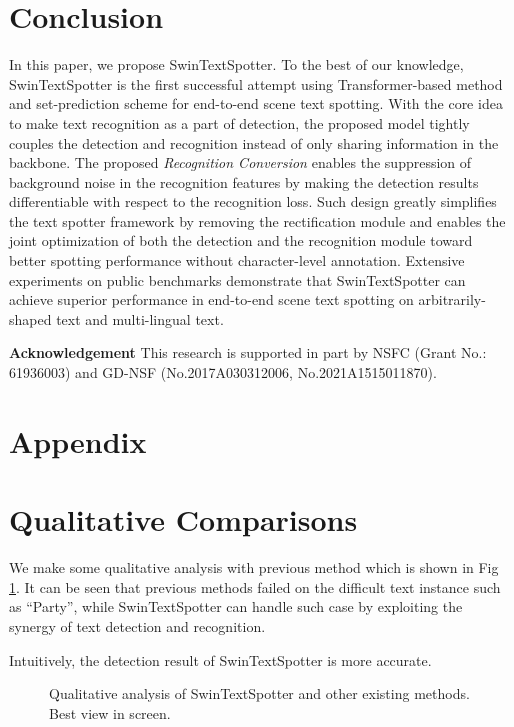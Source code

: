 \documentclass[10pt,twocolumn,letterpaper]{article}
\begin{document}
\section{Conclusion}
In this paper, we propose SwinTextSpotter. To the best of our knowledge, SwinTextSpotter is the first successful attempt using Transformer-based method and set-prediction scheme for end-to-end scene text spotting. With the core idea to make text recognition as a part of detection, the proposed model tightly couples the detection and recognition instead of only sharing information in the backbone.
The proposed \textit{Recognition Conversion} enables the suppression of background noise in the recognition features by making the detection results differentiable with respect to the recognition loss.
Such design greatly simplifies the text spotter framework by removing the rectification module and enables the joint optimization of both the detection and the recognition module toward better spotting performance without character-level annotation.
Extensive experiments on public benchmarks demonstrate that SwinTextSpotter can achieve superior performance in end-to-end scene text spotting on arbitrarily-shaped text and multi-lingual text. 


\noindent \textbf{Acknowledgement} This research is supported in part by NSFC (Grant No.: 61936003) and GD-NSF (No.2017A030312006, No.2021A1515011870).

\appendix
{\centering\section*{Appendix}}
\section{Qualitative Comparisons}
We make some qualitative analysis with previous method which is shown in Fig \ref{fig:qualitative_comparisons_results}. It can be seen that previous methods failed on the difficult text instance such as ``Party'', while SwinTextSpotter can handle such case by exploiting the synergy of text detection and recognition. 

Intuitively, 
the detection result of SwinTextSpotter is more accurate.

\begin{figure}[h]
    \centering
    \caption{Qualitative analysis of SwinTextSpotter and other existing methods. Best view in screen.}
    \label{fig:qualitative_comparisons_results}
\end{figure}
\end{document}
